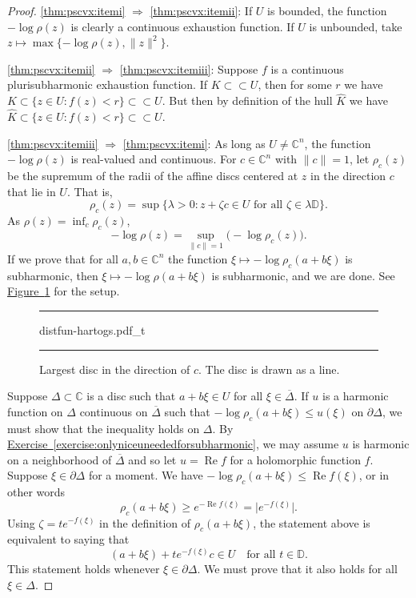 \documentclass[12pt,openany]{book}
\renewcommand{\Re}{\operatorname{Re}}
\newcommand{\snorm}[1]{\lVert {#1} \rVert}
\newcommand{\babs}[1]{\bigl\lvert {#1} \bigr\rvert}
\newcommand{\C}{{\mathbb{C}}}
\newcommand{\D}{{\mathbb{D}}}
\theoremstyle{plain}
\theoremstyle{remark}
\theoremstyle{definition}
\newenvironment{myfig}{%
\begin{figure}[h!t]
\noindent\rule{\textwidth}{0.5pt}\vspace{12pt}\par\centering}%
{\par\noindent\rule{\textwidth}{0.5pt}
\end{figure}}
\theoremstyle{exercise}
\theoremstyle{example}
\newcommand{\figureref}[1]{\hyperref[#1]{Figure~\ref*{#1}}}
\newcommand{\exerciseref}[1]{\hyperref[#1]{Exercise~\ref*{#1}}}
\begin{document}
\begin{proof}
\ref{thm:pscvx:itemi}
$\Rightarrow$
\ref{thm:pscvx:itemii}:
If $U$ is bounded,
the function $-\log \rho(z)$ is clearly a continuous exhaustion function.
If $U$ is unbounded, take
$z \mapsto \max \{ -\log \rho(z) , \snorm{z}^2 \}$.

\ref{thm:pscvx:itemii}
$\Rightarrow$
\ref{thm:pscvx:itemiii}:
Suppose $f$ is a continuous plurisubharmonic exhaustion function.
If $K \subset \subset U$, then for some $r$ we have
$K \subset \{ z \in U : f(z) < r \} \subset \subset U$.
But then by definition of the hull $\widehat{K}$ we have
$\widehat{K} \subset \{ z \in U : f(z) < r \} \subset \subset U$.

\ref{thm:pscvx:itemiii}
$\Rightarrow$
\ref{thm:pscvx:itemi}:
As long as $U \not= \C^n$,
the function $-\log \rho(z)$ is real-valued and continuous.
For $c \in \C^n$ with $\snorm{c}=1$, let
$\rho_c(z)$ be the supremum of the radii of the affine discs centered at $z$
in the direction $c$ that lie in $U$.  That is,
\begin{equation*}
\rho_c(z) =
\sup \bigl\{ \lambda > 0 :
z+ \zeta c \in U \text{ for all $\zeta \in \lambda\D$} \bigr\} .
\end{equation*}
As $\rho(z) = \inf_c \rho_c(z)$,
\begin{equation*}
- \log \rho(z) = \sup_{\snorm{c}=1} \bigl(-\log \rho_c(z)\bigr) .
\end{equation*}
If we prove that for all $a, b \in \C^n$ the function $\xi \mapsto -\log \rho_c(a+b\xi)$ is
subharmonic, then $\xi \mapsto - \log \rho(a+b\xi)$ is subharmonic,
and we are done.
See \figureref{fig:distfun-hartogs} for the setup.
\begin{myfig}
{distfun-hartogs.pdf_t}
\caption{Largest disc in the direction of $c$.
The disc is drawn as a line.\label{fig:distfun-hartogs}}
\end{myfig}

Suppose $\Delta \subset \C$ is a disc such that
$a+b\xi \in U$
for all $\xi \in
\overline{\Delta}$.
If $u$ is a harmonic function on $\Delta$ continuous on $\overline{\Delta}$
such that
$- \log \rho_c(a+b\xi) \leq u(\xi)$ on $\partial \Delta$, we must
show that the inequality holds on $\Delta$.
By \exerciseref{exercise:onlyniceuneededforsubharmonic},
we may assume $u$ is harmonic on a neighborhood of $\overline{\Delta}$
and so let $u = \Re f$ for a holomorphic function $f$.
Suppose $\xi \in \partial \Delta$ for a moment.
We have  $- \log \rho_c(a+b\xi) \leq \Re
f(\xi)$,
or in other words
\begin{equation*}
\rho_c(a+b\xi) \geq e^{-\Re f(\xi)} = \babs{e^{-f(\xi)}}.
\end{equation*}
Using $\zeta = t e^{-f(\xi)}$ in the definition of $\rho_c(a+b\xi)$, the statement above is equivalent
to saying that
\begin{equation*}
(a+b\xi)+te^{-f(\xi)}c \in U \quad \text{for all $t \in \D$}.
\end{equation*}
This statement holds whenever $\xi \in \partial \Delta$.  We must prove that
it also holds for all $\xi \in \Delta$.


\end{proof}
\end{document}
